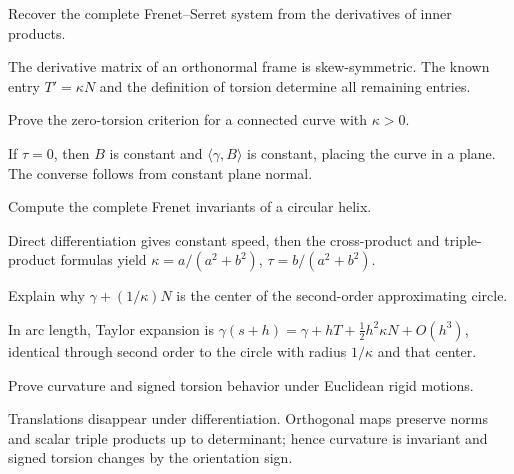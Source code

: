 \begin{problem}\label{prob:vii13-04}
Recover the complete Frenet--Serret system from the derivatives of inner products.
\end{problem}
\begin{solution}
The derivative matrix of an orthonormal frame is skew-symmetric. The known entry \(T'=\kappa N\) and the definition of torsion determine all remaining entries.
\end{solution}

\begin{problem}\label{prob:vii13-05}
Prove the zero-torsion criterion for a connected curve with \(\kappa>0\).
\end{problem}
\begin{solution}
If \(\tau=0\), then \(B\) is constant and \(\langle\gamma,B\rangle\) is constant, placing the curve in a plane. The converse follows from constant plane normal.
\end{solution}

\begin{problem}\label{prob:vii13-06}
Compute the complete Frenet invariants of a circular helix.
\end{problem}
\begin{solution}
Direct differentiation gives constant speed, then the cross-product and triple-product formulas yield \(\kappa=a/(a^2+b^2)\), \(\tau=b/(a^2+b^2)\).
\end{solution}

\begin{problem}\label{prob:vii13-07}
Explain why \(\gamma+(1/\kappa)N\) is the center of the second-order approximating circle.
\end{problem}
\begin{solution}
In arc length, Taylor expansion is \(\gamma(s+h)=\gamma+hT+\tfrac12h^2\kappa N+O(h^3)\), identical through second order to the circle with radius \(1/\kappa\) and that center.
\end{solution}

\begin{problem}\label{prob:vii13-08}
Prove curvature and signed torsion behavior under Euclidean rigid motions.
\end{problem}
\begin{solution}
Translations disappear under differentiation. Orthogonal maps preserve norms and scalar triple products up to determinant; hence curvature is invariant and signed torsion changes by the orientation sign.
\end{solution}


